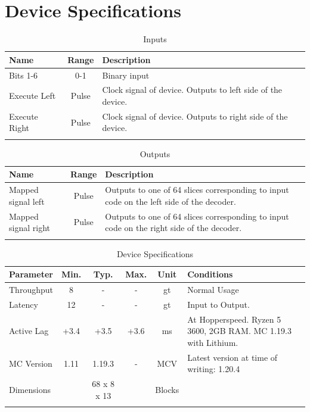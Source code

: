 \documentclass[10pt]{datasheet}
\begin{document}
\onecolumn

\section{Device Specifications}

\begin{table}[h]
    \caption{Inputs}
    \begin{tabularx}{\textwidth}{l | c | X}
        \thickhline
        \textbf{Name} & \textbf{Range} & \textbf{Description} \\
        \hline
        Bits 1-6 & 0-1 & Binary input \\
        \hline
        Execute Left & Pulse & Clock signal of device. Outputs to left side of the device. \\
        \hline
        Execute Right & Pulse & Clock signal of device. Outputs to right side of the device. \\
        \thickhline
\end{tabularx}
\end{table}

\begin{table}[h]
    \caption{Outputs}
    \begin{tabularx}{\textwidth}{l | c | X}
        \thickhline
        \textbf{Name} & \textbf{Range} & \textbf{Description} \\
        \hline
        Mapped signal left & Pulse & Outputs to one of 64 slices corresponding to input code on the left side of the decoder. \\
        \hline
        Mapped signal right & Pulse & Outputs to one of 64 slices corresponding to input code on the right side of the decoder. \\
        \thickhline
\end{tabularx}
\end{table}

\begin{table}[h]
    \caption{Device Specifications}
    \begin{tabularx}{\textwidth}{l | c c c | c | X}
        \thickhline
        \textbf{Parameter} & \textbf{Min.} & \textbf{Typ.} & \textbf{Max.} &
        \textbf{Unit} & \textbf{Conditions} \\
        \hline
        Throughput  & 8 & - & - & gt & Normal Usage \\
        \hline
        Latency  & 12 & - & - & gt & Input to Output. \\
        \hline
        Active Lag & +3.4 & +3.5 & +3.6 & ms & At Hopperspeed. Ryzen 5 3600, 2GB RAM. MC 1.19.3 with Lithium. \\
        \hline
        MC Version & 1.11 & 1.19.3 & - & MCV & Latest version at time of writing: 1.20.4\\
        \hline
        Dimensions & & 68 x 8 x 13 & & Blocks & \\
        \thickhline
\end{tabularx}
\end{table}
\newpage
\end{document}
